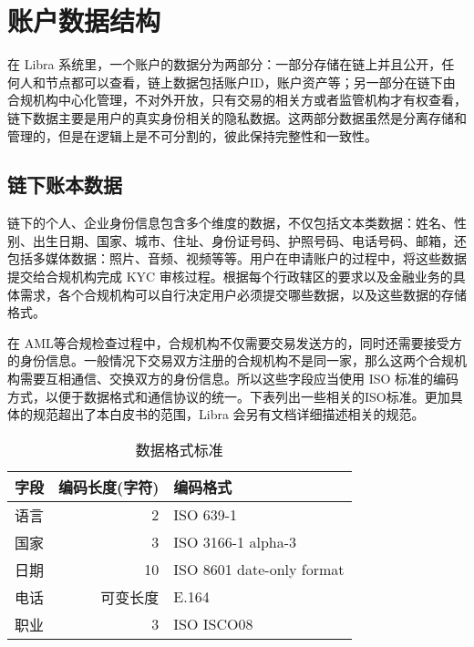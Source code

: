 \section{账户数据结构}\label{sec:account_structure}

在 Libra 系统里，一个账户的数据分为两部分：一部分存储在链上并且公开，任何人和节点都可以查看，链上数据包括账户ID，账户资产等；另一部分在链下由合规机构中心化管理，不对外开放，只有交易的相关方或者监管机构才有权查看，链下数据主要是用户的真实身份相关的隐私数据。这两部分数据虽然是分离存储和管理的，但是在逻辑上是不可分割的，彼此保持完整性和一致性。

\subsection{链下账本数据}
链下的个人、企业身份信息包含多个维度的数据，不仅包括文本类数据：姓名、性别、出生日期、国家、城市、住址、身份证号码、护照号码、电话号码、邮箱，还包括多媒体数据：照片、音频、视频等等。用户在申请账户的过程中，将这些数据提交给合规机构完成 KYC 审核过程。根据每个行政辖区的要求以及金融业务的具体需求，各个合规机构可以自行决定用户必须提交哪些数据，以及这些数据的存储格式。

在 AML等合规检查过程中，合规机构不仅需要交易发送方的，同时还需要接受方的身份信息。一般情况下交易双方注册的合规机构不是同一家，那么这两个合规机构需要互相通信、交换双方的身份信息。所以这些字段应当使用 ISO 标准的编码方式，以便于数据格式和通信协议的统一。下表列出一些相关的ISO标准。更加具体的规范超出了本白皮书的范围，Libra 会另有文档详细描述相关的规范。

\begin{table}[h!]
    \caption{数据格式标准} 
    \label{tab:data_format}
    \small %
    \centering %
    \begin{tabular}{lrl} %
        \toprule[\heavyrulewidth]\toprule[\heavyrulewidth]
        \textbf{字段} & \textbf{编码长度(字符)} & \textbf{编码格式} \\ 
        \midrule
        语言 & 2 & ISO 639-1 \\
        国家 & 3 & ISO 3166-1 alpha-3 \\
        日期 & 10 & ISO 8601 date-only format \\
        电话 & 可变长度 & E.164 \\
        职业 & 3 & ISO ISCO08 \\
        \bottomrule[\heavyrulewidth] 
    \end{tabular}
\end{table}

